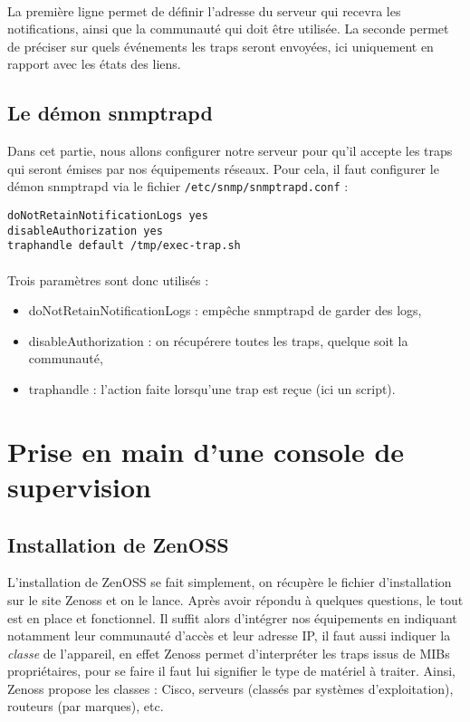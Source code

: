 \documentclass[12pt,a4paper,notitlepage]{article}
\begin{document}
\paragraph{} La première ligne permet de définir l'adresse du serveur qui recevra les notifications, ainsi que la communauté qui doit être utilisée. La seconde permet de préciser sur quels événements les traps seront envoyées, ici uniquement en rapport avec les états des liens.

\subsection{Le démon snmptrapd}
Dans cet partie, nous allons configurer notre serveur pour qu'il accepte les traps qui seront émises par nos équipements réseaux. Pour cela, il faut configurer le démon snmptrapd via le fichier \texttt{/etc/snmp/snmptrapd.conf} :

\begin{lstlisting}[title=Activation des traps pour l'état des liens]
doNotRetainNotificationLogs yes
disableAuthorization yes
traphandle default /tmp/exec-trap.sh
\end{lstlisting}

\paragraph{} Trois paramètres sont donc utilisés : 
\begin{itemize}
\item doNotRetainNotificationLogs : empêche snmptrapd de garder des logs,
\item disableAuthorization : on récupérere toutes les traps, quelque soit la communauté,
\item traphandle : l'action faite lorsqu'une trap est reçue (ici un script).
\end{itemize}


\section{Prise en main d'une console de supervision}
\subsection{Installation de ZenOSS}
L'installation de ZenOSS se fait simplement, on récupère le fichier d'installation sur le site Zenoss et on le lance. Après avoir répondu à quelques questions, le tout est en place et fonctionnel. Il suffit alors d'intégrer nos équipements en indiquant notamment leur communauté d'accès et leur adresse IP, il faut aussi indiquer la \textit{classe} de l'appareil, en effet Zenoss permet d'interpréter les traps issus de MIBs propriétaires, pour se faire il faut lui signifier le type de matériel à traiter. Ainsi, Zenoss propose les classes : Cisco, serveurs (classés par systèmes d'exploitation), routeurs (par marques), etc.
\end{document}
